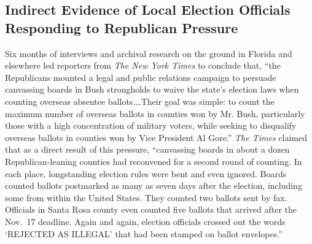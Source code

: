 \documentclass[11pt,titlepage]{article}
\begin{document}
\subsection{Indirect Evidence of Local Election Officials Responding
  to Republican Pressure}

Six months of interviews and archival research on the ground in
Florida and elsewhere led reporters from \emph{The New York Times} to
conclude that, ``the Republicans mounted a legal and public relations
campaign to persuade canvassing boards in Bush strongholds to waive
the state's election laws when counting overseas absentee
ballots.\ldots Their goal was simple: to count the maximum number of
overseas ballots in counties won by Mr.  Bush, particularly those with
a high concentration of military voters, while seeking to disqualify
overseas ballots in counties won by Vice President Al Gore.''
\emph{The Times} claimed that as a direct result of this pressure,
``canvassing boards in about a dozen Republican-leaning counties had
reconvened for a second round of counting.  In each place,
longstanding election rules were bent and even ignored.  Boards
counted ballots postmarked as many as seven days after the election,
including some from within the United States.  They counted two
ballots sent by fax.  Officials in Santa Rosa county even counted five
ballots that arrived after the Nov.\ 17 deadline.  Again and again,
election officials crossed out the words `REJECTED AS ILLEGAL' that
had been stamped on ballot envelopes.''
\end{document}
